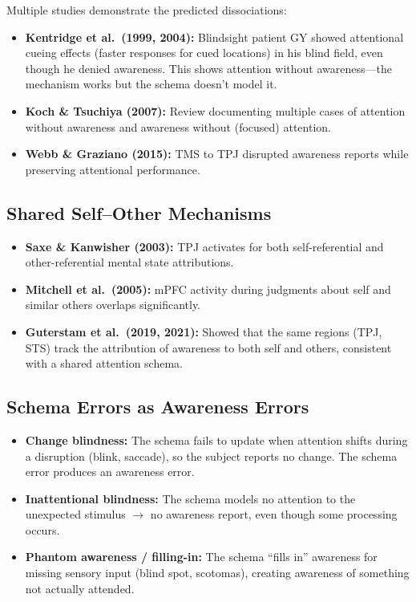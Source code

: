 \documentclass[11pt,a4paper]{report}
\begin{document}
Multiple studies demonstrate the predicted dissociations:
\begin{itemize}[leftmargin=1.5em]
  \item \textbf{Kentridge et al.\ (1999, 2004):} Blindsight patient GY showed attentional cueing effects (faster responses for cued locations) in his blind field, even though he denied awareness. This shows attention without awareness---the mechanism works but the schema doesn't model it.
  \item \textbf{Koch \& Tsuchiya (2007):} Review documenting multiple cases of attention without awareness and awareness without (focused) attention.
  \item \textbf{Webb \& Graziano (2015):} TMS to TPJ disrupted awareness reports while preserving attentional performance.
\end{itemize}

\subsection{Shared Self--Other Mechanisms}

\begin{itemize}[leftmargin=1.5em]
  \item \textbf{Saxe \& Kanwisher (2003):} TPJ activates for both self-referential and other-referential mental state attributions.
  \item \textbf{Mitchell et al.\ (2005):} mPFC activity during judgments about self and similar others overlaps significantly.
  \item \textbf{Guterstam et al.\ (2019, 2021):} Showed that the same regions (TPJ, STS) track the attribution of awareness to both self and others, consistent with a shared attention schema.
\end{itemize}

\subsection{Schema Errors as Awareness Errors}

\begin{itemize}[leftmargin=1.5em]
  \item \textbf{Change blindness:} The schema fails to update when attention shifts during a disruption (blink, saccade), so the subject reports no change. The schema error produces an awareness error.
  \item \textbf{Inattentional blindness:} The schema models no attention to the unexpected stimulus $\to$ no awareness report, even though some processing occurs.
  \item \textbf{Phantom awareness / filling-in:} The schema ``fills in'' awareness for missing sensory input (blind spot, scotomas), creating awareness of something not actually attended.
\end{itemize}
\end{document}
